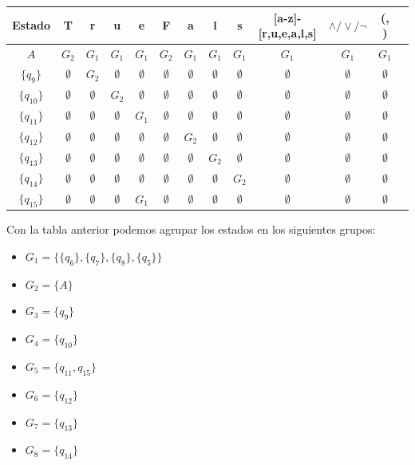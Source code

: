\begin{table}[h!]
\centering
\begin{tabular}{|c|c|c|c|c|c|c|c|c|c|c|c|c|}
\hline
Estado &T & r & u & e & F & a & l &s &[a-z]-[r,u,e,a,l,s] &$\land/\lor/\lnot$ & (, )\\ \hline
\hline
$A$ & $ G_2$ & $ G_1$ & $G_1$ & $G_1$ & $G_2$ & $G_1$ & $G_1$ & $G_1$ & $G_1$ & $G_1$& $G_1$\\ \hline
$\{q_9\}$ & $\emptyset$ & $G_2$ & $\emptyset$ & $\emptyset$ & $\emptyset$  & $\emptyset$ & $\emptyset$ & $\emptyset$ & $\emptyset$ & $\emptyset$ & $\emptyset$\\ \hline
$\{q_{10}\}$ & $\emptyset$ &  $\emptyset$&  $G_2$& $\emptyset$ & $\emptyset$  & $\emptyset$ & $\emptyset$ & $\emptyset$ & $\emptyset$ & $\emptyset$ & $\emptyset$\\ \hline
$\{q_{11}\}$ & $\emptyset$ &  $\emptyset$& $\emptyset$ &  $G_1$& $\emptyset$  & $\emptyset$ & $\emptyset$ & $\emptyset$ & $\emptyset$ & $\emptyset$ & $\emptyset$\\ \hline
$\{q_{12}\}$ & $\emptyset$ & $\emptyset$ & $\emptyset$ & $\emptyset$  & $\emptyset$  & $G_2$ & $\emptyset$ & $\emptyset$& $\emptyset$ & $\emptyset$ & $\emptyset$\\ \hline
$\{q_{13}\}$ & $\emptyset$ &  $\emptyset$& $\emptyset$ & $\emptyset$ & $\emptyset$  & $\emptyset$ & $G_2$ & $\emptyset$ & $\emptyset$ & $\emptyset$ & $\emptyset$\\ \hline
$\{q_{14}\}$ & $\emptyset$ &  $\emptyset$& $\emptyset$ & $\emptyset$ & $\emptyset$  & $\emptyset$ & $\emptyset$ & $G_2$ & $\emptyset$ & $\emptyset$ & $\emptyset$\\ \hline
$\{q_{15}\}$ & $\emptyset$ &  $\emptyset$& $\emptyset$ & $G_1$ & $\emptyset$  & $\emptyset$ & $\emptyset$ & $\emptyset$ & $\emptyset$ & $\emptyset$ & $\emptyset$\\ \hline
\end{tabular}
\end{table}


Con la tabla anterior podemos agrupar los estados en los siguientes grupos:
\begin{itemize}
    \item $G_1 = \{\{q_6\}, \{q_7\}, \{q_8\}, \{q_5\}\}$
    \item $G_2 = \{A\}$
    \item $G_3 = \{q_9\}$
    \item $G_4 = \{q_{10}\}$
    \item $G_5 = \{q_{11},q_{15}\}$
    \item $G_6 = \{q_{12}\}$
    \item $G_7 = \{q_{13}\}$
    \item $G_8 = \{q_{14}\}$
\end{itemize}

